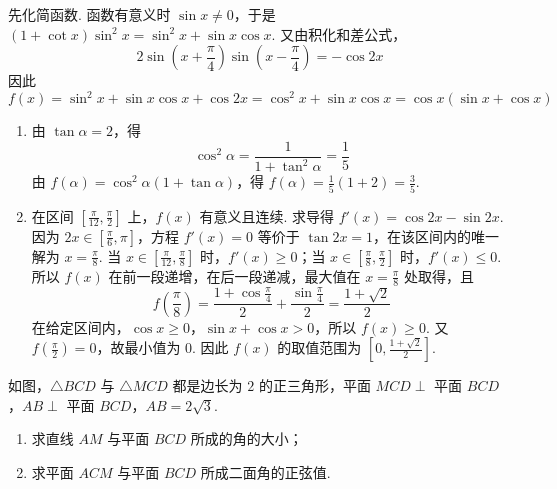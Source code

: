 \begin{solution}
先化简函数. 函数有意义时 \(\sin x\ne0\)，于是 \((1+\cot x)\sin^{2}x=\sin^{2}x+\sin x\cos x\). 又由积化和差公式，
\[
2\sin\left(x+\frac{\pi}{4}\right)\sin\left(x-\frac{\pi}{4}\right)=-\cos2x
\]
因此
\[
f(x)=\sin^{2}x+\sin x\cos x+\cos2x=\cos^{2}x+\sin x\cos x=\cos x(\sin x+\cos x)
\]

\begin{enumerate}
\item 由 \(\tan\alpha=2\)，得
\[
\cos^{2}\alpha=\frac{1}{1+\tan^{2}\alpha}=\frac{1}{5}
\]
由 \(f(\alpha)=\cos^{2}\alpha(1+\tan\alpha)\)，得 \(f(\alpha)=\frac{1}{5}(1+2)=\frac{3}{5}\).

\item 在区间 \(\left[\frac{\pi}{12},\frac{\pi}{2}\right]\) 上，\(f(x)\) 有意义且连续. 求导得 \(f'(x)=\cos2x-\sin2x\). 因为 \(2x\in\left[\frac{\pi}{6},\pi\right]\)，方程 \(f'(x)=0\) 等价于 \(\tan2x=1\)，在该区间内的唯一解为 \(x=\frac{\pi}{8}\). 当 \(x\in\left[\frac{\pi}{12},\frac{\pi}{8}\right]\) 时，\(f'(x)\geqslant0\)；当 \(x\in\left[\frac{\pi}{8},\frac{\pi}{2}\right]\) 时，\(f'(x)\leqslant0\). 所以 \(f(x)\) 在前一段递增，在后一段递减，最大值在 \(x=\frac{\pi}{8}\) 处取得，且
\[
f\left(\frac{\pi}{8}\right)=\frac{1+\cos\frac{\pi}{4}}{2}+\frac{\sin\frac{\pi}{4}}{2}=\frac{1+\sqrt{2}}{2}
\]
在给定区间内，\(\cos x\geqslant0\)，\(\sin x+\cos x>0\)，所以 \(f(x)\geqslant0\). 又 \(f\left(\frac{\pi}{2}\right)=0\)，故最小值为 \(0\). 因此 \(f(x)\) 的取值范围为 \(\left[0,\frac{1+\sqrt{2}}{2}\right]\).
\end{enumerate}
\end{solution}

\begin{problem}
如图，\(\triangle BCD\) 与 \(\triangle MCD\) 都是边长为 \(2\) 的正三角形，平面 \(MCD \perp\) 平面 \(BCD\)，\(AB \perp\) 平面 \(BCD\)，\(AB = 2\sqrt{3}\).
\begin{enumerate}
\item 求直线 \(AM\) 与平面 \(BCD\) 所成的角的大小；
\item 求平面 \(ACM\) 与平面 \(BCD\) 所成二面角的正弦值.
\end{enumerate}

\end{problem}

